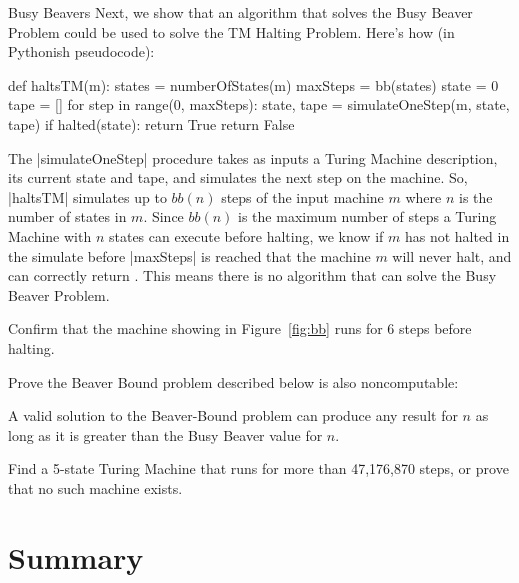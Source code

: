 \begin{schemeregion}
\begin{exploration}{Busy Beavers}
Next, we show that an algorithm that solves the Busy Beaver Problem could be used to solve the TM Halting Problem.  Here's how (in Pythonish pseudocode):
\begin{pythoncode}
def haltsTM(m):
   states = numberOfStates(m)
   maxSteps = bb(states)
   state = 0
   tape = []
   for step in range(0, maxSteps):
      state, tape = simulateOneStep(m, state, tape)
      if halted(state): return True
   return False      
\end{pythoncode}
The \pycode|simulateOneStep| procedure takes as inputs a Turing Machine description, its current state and tape, and simulates the next step on the machine.  So, \pycode|haltsTM| simulates up to $bb(n)$ steps of the input machine $m$ where $n$ is the number of states in $m$.  Since $bb(n)$ is the maximum number of steps a Turing Machine with $n$ states can execute before halting, we know if $m$ has not halted in the simulate before \pycode|maxSteps| is reached that the machine $m$ will never halt, and can correctly return \False.  This means there is no algorithm that can solve the Busy Beaver Problem.

\beforeex
\begin{exercise}
Confirm that the machine showing in Figure~\ref{fig:bb} runs for 6 steps before halting.
\solution{\LATER{}}
\end{exercise}
\afterex


\beforeex
\begin{exercise}
Prove the Beaver Bound problem described below is also noncomputable:


A valid solution to the Beaver-Bound problem can produce any result for $n$ as long as it is greater than the Busy Beaver value for $n$.
\solution{\LATER{}}
\end{exercise}
\afterex

\beforeex
\begin{exercise}
\triplegoldstar Find a 5-state Turing Machine that runs for more than 47,176,870 steps, or prove that no such machine exists.
\solution{\LATER{}}
\end{exercise}
\afterex


\end{exploration}


\section{Summary}


\end{schemeregion}
